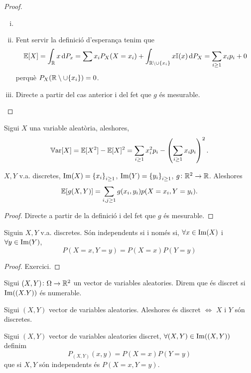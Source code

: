 \begin{proof}
    \begin{enumerate}[i)]
        \item[]
        \item Fent servir la definició d'esperança tenim que
	  \[ \esp[X] = \int_{\real}{x\dif P_x} = \sum{x_i P_X(X=x_i) + \int_{\real\setminus\cup\{x_i\}}{x\mathbb{I}(x) \dif P_X}} = \sum_{i \ge 1}{x_i p_i} + 0\]
            perquè $P_X(\mathbb{R}\setminus\cup\{x_i\}) = 0$.
        \item Directe a partir del cas anterior i del fet que $g$ és mesurable.
    \end{enumerate}
\end{proof}

\begin{obs}
    Sigui $X$ una variable aleatòria, aleshores,
    \[\operatorname{\mathbb{V}ar}[X] = \operatorname{\mathbb{E}}[X^2] - \operatorname{\mathbb{E}}[X]^2 = \sum_{i \ge 1}{x_i^2 p_i} - \left(\sum_{i \ge 1}{x_i p_i}\right)^2.\]
\end{obs}

\begin{prop}
    $X, Y$ v.a. discretes, $\operatorname{Im}(X) = \left\{ x_i \right\}_{i \ge 1}$, $\operatorname{Im}(Y) = \left\{ y_i \right\}_{i \ge 1}$, $g\colon \mathbb{R}^2\to\mathbb{R}$. Aleshores
    \[\operatorname{\mathbb{E}}[g(X,Y)] = \sum_{i,j \ge 1}{g(x_i,y_i) p(X=x_i, Y=y_i)}.\]
\end{prop}
\begin{proof}
    Directe a partir de la definició i del fet que $g$ és mesurable.
\end{proof}


\begin{prop}
    Siguin $X,Y$ v.a. discretes. Són independents si i només si, $\forall x \in\operatorname{Im}(X)$ i $\forall y \in\operatorname{Im}(Y)$,
    \[P(X=x, Y=y) = P(X=x)P(Y=y)\]
\end{prop}
\begin{proof}
    Exercici.
\end{proof}


\begin{defi}
    Sigui $(X,Y)\colon \Omega\to\mathbb{R}^2$ un vector de variables aleatories. Direm que és discret si $\operatorname{Im}((X.Y))$ és numerable.
\end{defi}

\begin{obs}
    Sigui $(X,Y)$ vector de variables aleatories. Aleshores és discret $\iff$ $X$ i $Y$ són discretes.
\end{obs}

\begin{defi}
    Sigui $(X,Y)$ vector de variables aleatories discret, $\forall(X,Y) \in \operatorname{Im}((X,Y))$ definim
    \[P_{(X,Y)}(x,y) = P(X=x)P(Y=y)\]
    que si $X,Y$ són independents és $P(X=x,Y=y)$.
\end{defi}

